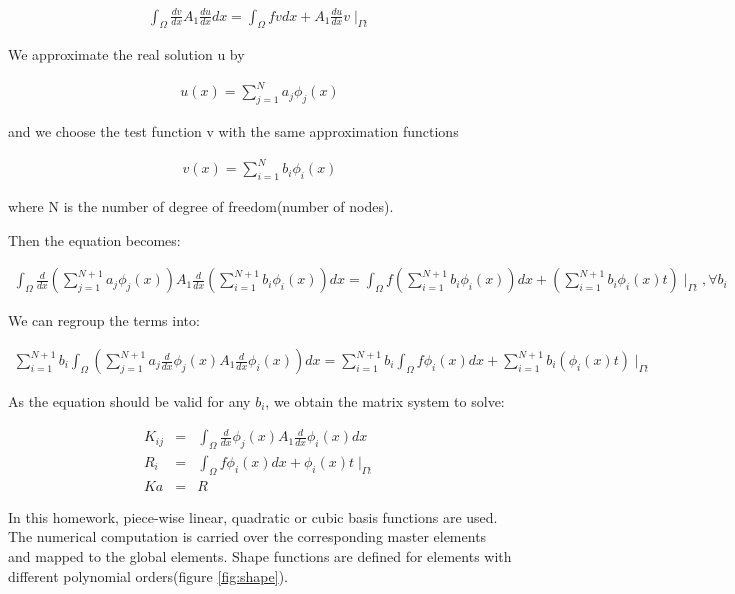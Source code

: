 \documentclass[paper=a4, fontsize=11pt]{article} %
\begin{document}
\begin{eqnarray}
\int_{\Omega} \frac{dv}{dx} A_1 \frac{du}{dx} dx = \int_{\Omega} fv dx + A_1 \frac{du}{dx} v \mid _{\Gamma t}
\end{eqnarray}


We approximate the real solution u by

\begin{eqnarray}
u(x) = \sum_{j=1}^{N} a_j \phi_j(x)
\end{eqnarray}

and we choose the test function v with the same approximation functions

\begin{eqnarray}
v(x) = \sum_{i=1}^{N} b_i \phi_i(x)
\end{eqnarray}

where N is the number of degree of freedom(number of nodes). 


Then the equation becomes:

\begin{eqnarray}
\int_{\Omega} \frac{d}{dx} (\sum_{j=1}^{N+1} a_j \phi_j(x)) A_1 \frac{d}{dx} (\sum_{i=1}^{N+1} b_i \phi_i(x))dx = \int_{\Omega} f (\sum_{i=1}^{N+1} b_i \phi_i(x)) dx + (\sum_{i=1}^{N+1} b_i \phi_i(x) t) \mid _{\Gamma t}, \forall b_i
\end{eqnarray}


We can regroup the terms into:

\begin{eqnarray}
\sum_{i=1}^{N+1} b_i \int_{\Omega} (\sum_{j=1}^{N+1} a_j \frac{d}{dx} \phi_j(x) A_1 \frac{d}{dx} \phi_i(x)) dx = \sum_{i=1}^{N+1} b_i \int_{\Omega} f \phi_i(x) dx + \sum_{i=1}^{N+1} b_i (\phi_i(x) t) \mid _{\Gamma t}
\end{eqnarray}

As the equation should be valid for any $b_i$, we obtain the matrix system to solve:
 
\begin{eqnarray}
K_{ij} &=& \int_{\Omega} \frac{d}{dx} \phi_j(x) A_1 \frac{d}{dx} \phi_i(x) dx \nonumber\\
R_i &=& \int_{\Omega} f \phi_i(x) dx + \phi_i(x) t \mid _{\Gamma t}\nonumber\\
K a &=& R
\end{eqnarray}


In this homework, piece-wise linear, quadratic or cubic basis functions are used. The numerical computation is carried over the corresponding master elements and mapped to the global elements. Shape functions are defined for elements with different polynomial orders(figure \ref{fig:shape}).
\end{document}
